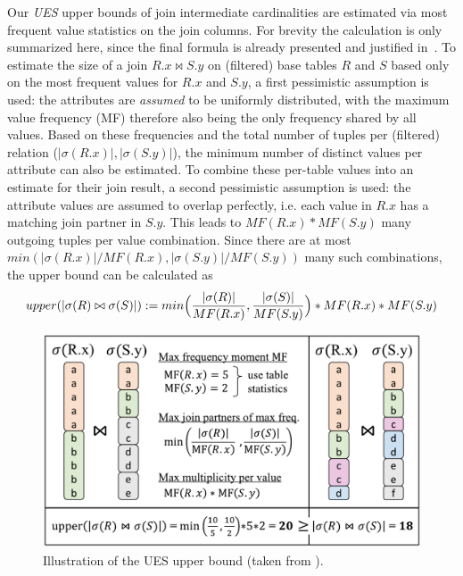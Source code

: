 


Our \emph{UES} upper bounds of join intermediate cardinalities are estimated via most frequent value statistics on the join columns. 
For brevity the calculation is only summarized here, since the final formula is already presented and justified in~\cite{hertzschuch-21-ues}.
To estimate the size of a join $R.x \bowtie S.y$ on (filtered) base tables $R$ and $S$ based only on the most frequent values for $R.x$ and $S.y$, a first pessimistic assumption is used: the attributes are \emph{assumed} to be uniformly distributed, with the maximum value frequency (MF) therefore also being the only frequency shared by all values. 
Based on these frequencies and the total number of tuples per (filtered) relation ($|\sigma(R.x)|, |\sigma(S.y)|$), the minimum number of distinct values per attribute can also be estimated.
To combine these per-table values into an estimate for their join result, a second pessimistic assumption is used: the attribute values are assumed to overlap perfectly, i.e. each value in $R.x$ has a matching join partner in $S.y$. 
This leads to $MF(R.x) * MF(S.y)$ many outgoing tuples per value combination. 
Since there are at most $min(|\sigma(R.x)| / MF(R.x), |\sigma(S.y)| / MF(S.y))$ many such combinations, the upper bound can be calculated as
$$upper(|\sigma(R) \bowtie \sigma(S)|) := min\Bigl(\frac{|\sigma(R)|}{MF(R.x)}, \frac{|\sigma(S)|}{MF(S.y)}\Bigr) * MF(R.x) * MF(S.y)$$

\begin{figure}[t]
    \centering
    \includegraphics[width=0.7\linewidth]{figures/upperBoundExplV6_.pdf}
    \caption{Illustration of the UES upper bound (taken from \cite{hertzschuch-21-ues}).}
    \label{fig:upperBoundExpl}
    \vspace{-0.4cm}
\end{figure}

